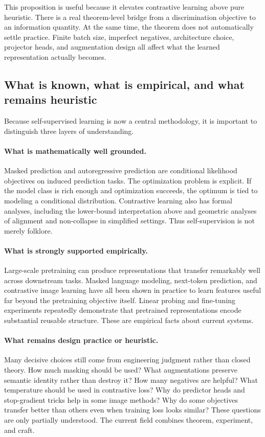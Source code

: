 This proposition is useful because it elevates contrastive learning above pure heuristic.
There is a real theorem-level bridge from a discrimination objective to an information quantity.
At the same time, the theorem does not automatically settle practice.
Finite batch size, imperfect negatives, architecture choice, projector heads, and augmentation design all affect what the learned representation actually becomes.

\subsection*{What is known, what is empirical, and what remains heuristic}

Because self-supervised learning is now a central methodology, it is important to distinguish three layers of understanding.

\paragraph{What is mathematically well grounded.}
Masked prediction and autoregressive prediction are conditional likelihood objectives on induced prediction tasks.
The optimization problem is explicit.
If the model class is rich enough and optimization succeeds, the optimum is tied to modeling a conditional distribution.
Contrastive learning also has formal analyses, including the lower-bound interpretation above and geometric analyses of alignment and non-collapse in simplified settings.
Thus self-supervision is not merely folklore.

\paragraph{What is strongly supported empirically.}
Large-scale pretraining can produce representations that transfer remarkably well across downstream tasks.
Masked language modeling, next-token prediction, and contrastive image learning have all been shown in practice to learn features useful far beyond the pretraining objective itself.
Linear probing and fine-tuning experiments repeatedly demonstrate that pretrained representations encode substantial reusable structure.
These are empirical facts about current systems.

\paragraph{What remains design practice or heuristic.}
Many decisive choices still come from engineering judgment rather than closed theory.
How much masking should be used?
What augmentations preserve semantic identity rather than destroy it?
How many negatives are helpful?
What temperature should be used in contrastive loss?
Why do predictor heads and stop-gradient tricks help in some image methods?
Why do some objectives transfer better than others even when training loss looks similar?
These questions are only partially understood.
The current field combines theorem, experiment, and craft.

